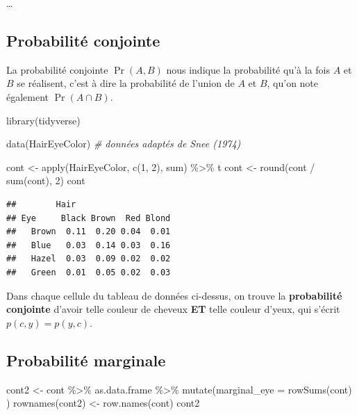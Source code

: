 \documentclass[
  a4paper,11pt,twoside,onecolumn,openright,final,oldfontcommands]{memoir}
\newenvironment{Shaded}{\begin{snugshade}}{\end{snugshade}}
\newcommand{\AttributeTok}[1]{\textcolor[rgb]{0.77,0.63,0.00}{#1}}
\newcommand{\CommentTok}[1]{\textcolor[rgb]{0.56,0.35,0.01}{\textit{#1}}}
\newcommand{\DecValTok}[1]{\textcolor[rgb]{0.00,0.00,0.81}{#1}}
\newcommand{\FunctionTok}[1]{\textcolor[rgb]{0.00,0.00,0.00}{#1}}
\newcommand{\NormalTok}[1]{#1}
\newcommand{\OtherTok}[1]{\textcolor[rgb]{0.56,0.35,0.01}{#1}}
\newcommand{\SpecialCharTok}[1]{\textcolor[rgb]{0.00,0.00,0.00}{#1}}
\theoremstyle{definition}
\theoremstyle{definition}
\theoremstyle{definition}
\theoremstyle{definition}
\theoremstyle{remark}
\begin{document}
\ldots{}

\hypertarget{probabilituxe9-conjointe}{%
\subsection{Probabilité conjointe}\label{probabilituxe9-conjointe}}

La probabilité conjointe \(\Pr(A, B)\) nous indique la probabilité qu'à la fois \(A\) et \(B\) se réalisent, c'est à dire la probabilité de l'union de \(A\) et \(B\), qu'on note également \(\Pr(A \cap B)\).

\begin{Shaded}
\begin{Highlighting}[]
\FunctionTok{library}\NormalTok{(tidyverse)}

\FunctionTok{data}\NormalTok{(HairEyeColor) }\CommentTok{\# données adaptés de Snee (1974)}

\NormalTok{cont }\OtherTok{\textless{}{-}} \FunctionTok{apply}\NormalTok{(HairEyeColor, }\FunctionTok{c}\NormalTok{(}\DecValTok{1}\NormalTok{, }\DecValTok{2}\NormalTok{), sum) }\SpecialCharTok{\%\textgreater{}\%}\NormalTok{ t }
\NormalTok{cont }\OtherTok{\textless{}{-}} \FunctionTok{round}\NormalTok{(cont }\SpecialCharTok{/} \FunctionTok{sum}\NormalTok{(cont), }\DecValTok{2}\NormalTok{)}
\NormalTok{cont}
\end{Highlighting}
\end{Shaded}

\begin{verbatim}
##        Hair
## Eye     Black Brown  Red Blond
##   Brown  0.11  0.20 0.04  0.01
##   Blue   0.03  0.14 0.03  0.16
##   Hazel  0.03  0.09 0.02  0.02
##   Green  0.01  0.05 0.02  0.03
\end{verbatim}

Dans chaque cellule du tableau de données ci-dessus, on trouve la \textbf{probabilité conjointe} d'avoir telle couleur de cheveux \textbf{ET} telle couleur d'yeux, qui s'écrit \(p(c, y) = p(y, c)\).

\hypertarget{probabilituxe9-marginale}{%
\subsection{Probabilité marginale}\label{probabilituxe9-marginale}}

\begin{Shaded}
\begin{Highlighting}[]
\NormalTok{cont2 }\OtherTok{\textless{}{-}}\NormalTok{ cont }\SpecialCharTok{\%\textgreater{}\%}\NormalTok{ as.data.frame }\SpecialCharTok{\%\textgreater{}\%} \FunctionTok{mutate}\NormalTok{(}\AttributeTok{marginal\_eye =} \FunctionTok{rowSums}\NormalTok{(cont) )}
\FunctionTok{rownames}\NormalTok{(cont2) }\OtherTok{\textless{}{-}} \FunctionTok{row.names}\NormalTok{(cont)}
\NormalTok{cont2}
\end{Highlighting}
\end{Shaded}
\end{document}
